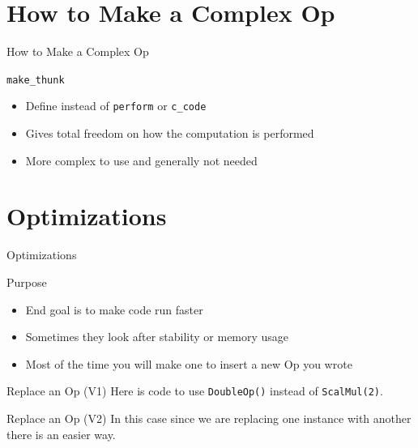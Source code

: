 \documentclass[utf8x]{beamer}
\newcommand{\code}[1]{\lstinline[emph={[2]}]|#1|}
\begin{document}
\section{How to Make a Complex Op}

\begin{frame}[plain]{}
\begin{center}
\Huge How to Make a Complex Op
\end{center}
\end{frame}

\begin{frame}{\code{make_thunk}}

\begin{itemize}
\item Define instead of \code{perform} or \code{c_code}
\item Gives total freedom on how the computation is performed
\item More complex to use and generally not needed
\end{itemize}
\end{frame}

\section{Optimizations}

\begin{frame}[plain]{}
\begin{center}
\Huge Optimizations
\end{center}
\end{frame}

\begin{frame}{Purpose}
\begin{itemize}
\item End goal is to make code run faster
\item Sometimes they look after stability or memory usage
\item Most of the time you will make one to insert a new Op you wrote
\end{itemize}
\end{frame}

\begin{frame}{Replace an Op (V1)}
Here is code to use \code{DoubleOp()} instead of \code{ScalMul(2)}.

\end{frame}

\begin{frame}{Replace an Op (V2)}
In this case since we are replacing one instance with another there is an easier way.

\end{frame}
\end{document}
